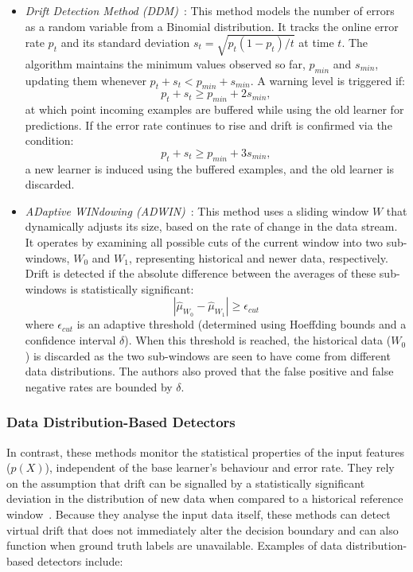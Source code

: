 \begin{itemize}
    \item \textit{Drift Detection Method (DDM)}~\cite{Gama_2004}: This method models the number of errors as a random variable from a Binomial distribution. It tracks the online error rate $p_t$ and its standard deviation $s_t = \sqrt{p_t(1-p_t)/t}$ at time $t$. The algorithm maintains the minimum values observed so far, $p_{min}$ and $s_{min}$, updating them whenever $p_t + s_t < p_{min} + s_{min}$. A warning level is triggered if: 
    \begin{equation} \label{eq:DDM warning}
        p_t + s_t \geq p_{min} + 2s_{min},
    \end{equation}
    at which point incoming examples are buffered while using the old learner for predictions. If the error rate continues to rise and drift is confirmed via the condition: 
    \begin{equation} \label{eq:DDM confirmation}
        p_t + s_t \geq p_{min} + 3s_{min},
    \end{equation}
    a new learner is induced using the buffered examples, and the old learner is discarded.

    \item \textit{ADaptive WINdowing (ADWIN)}~\cite{Bifet_2007}: This method uses a sliding window $W$ that dynamically adjusts its size, based on the rate of change in the data stream. It operates by examining all possible cuts of the current window into two sub-windows, $W_{0}$ and $W_{1}$, representing historical and newer data, respectively. Drift is detected if the absolute difference between the averages of these sub-windows is statistically significant:
    \begin{equation} \label{eq:ADWIN threshold}
        |\hat{\mu}_{W_0} - \hat{\mu}_{W_1}| \geq \epsilon_{cut}
    \end{equation}
    where $\epsilon_{cut}$ is an adaptive threshold (determined using Hoeffding bounds and a confidence interval $\delta$). When this threshold is reached, the historical data ($W_{0}$) is discarded as the two sub-windows are seen to have come from different data distributions. The authors also proved that the false positive and false negative rates are bounded by $\delta$.
\end{itemize}

\subsubsection{Data Distribution-Based Detectors}
In contrast, these methods monitor the statistical properties of the input features ($p(X)$), independent of the base learner's behaviour and error rate. They rely on the assumption that drift can be signalled by a statistically significant deviation in the distribution of new data when compared to a historical reference window~\cite{Lu_2018}. Because they analyse the input data itself, these methods can detect virtual drift that does not immediately alter the decision boundary and can also function when ground truth labels are unavailable. Examples of data distribution-based detectors include:

